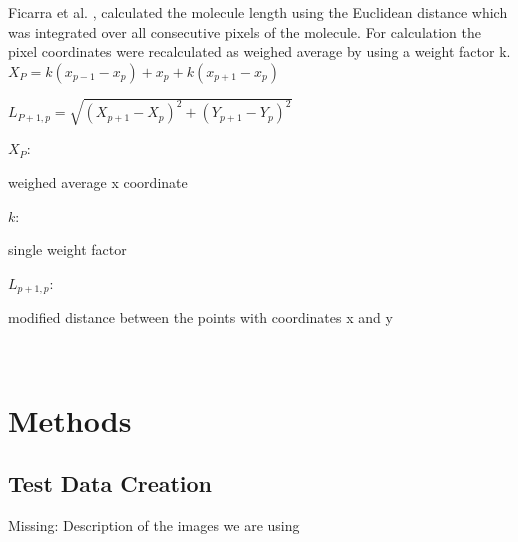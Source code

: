 \documentclass{article}
\begin{document}
Ficarra et al. \cite{ficarra2002automated},  \cite{ficarra2005automated} calculated the molecule length using the Euclidean distance which was integrated over all consecutive pixels of the molecule. For calculation the pixel coordinates were recalculated as weighed average by using a weight factor k.\\


$ X_{P} = k(x_{p-1}-x_{p})+x_{p}+k(x_{p+1}-x_{p}) $

$ L_{P+1,p}= \sqrt{(X_{p+1}-X_{p})^{2}+(Y_{p+1}-Y_{p})^{2}} $

\hspace{0,2cm}

$ X_{P} $:\begin{footnotesize}
weighed average x coordinate
\end{footnotesize}

$ k $:\begin{footnotesize} 
single weight factor
\end{footnotesize}

$ L_{p+1,p} $:\begin{footnotesize} 
modified distance between the points with coordinates x and y
\end{footnotesize}\\




\section{Methods}\label{sec:Methods}
\subsection{Test Data Creation}\label{sec:Test Data Creation}
Missing: Description of the images we are using
\end{document}
